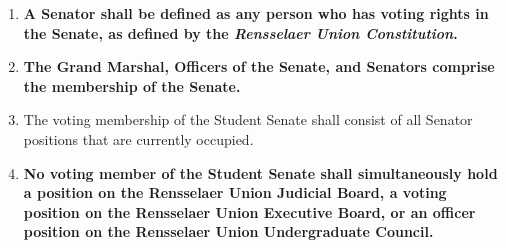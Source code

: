 \begin{enumerate}
    \item \textbf{A Senator shall be defined as any person who has voting rights in the Senate, as defined by the \textit{Rensselaer Union Constitution}.}
    \item \textbf{The Grand Marshal, Officers of the Senate, and Senators comprise the membership of the Senate.}
    \item The voting membership of the Student Senate shall consist of all Senator positions that are currently occupied.
    \item \textbf{No voting member of the Student Senate shall simultaneously hold a position on the Rensselaer Union Judicial Board, a voting position on the Rensselaer Union Executive Board, or an officer position on the Rensselaer Union Undergraduate Council.}
\end{enumerate}
